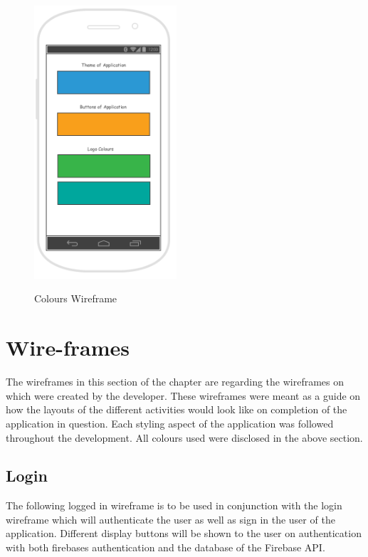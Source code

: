 \begin{figure}[htbp]
    \center \includegraphics[width=150pt]{ColoursWireframe}\\
    \caption{Colours Wireframe} \label{Figure: Colours Wireframe}
\end{figure}

\section{Wire-frames}
The wireframes in this section of the chapter are regarding the wireframes on which were created by the developer. These wireframes were meant as a guide on how the layouts of the different activities would look like on completion of the application in question. Each styling aspect of the application was followed throughout the development. All colours used were disclosed in the above section.

\subsection{Login}
The following logged in wireframe is to be used in conjunction with the login wireframe which will authenticate the user as well as sign in the user of the application. Different display buttons will be shown to the user on authentication with both firebases authentication and the database of the Firebase API.

